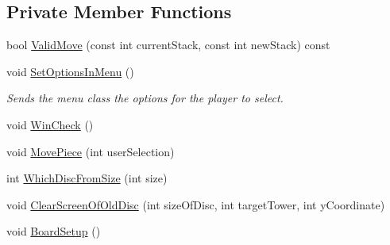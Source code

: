 \subsection*{Private Member Functions}
\begin{DoxyCompactItemize}
\item 
bool \hyperlink{classHanoi_a30dc9940db3589121396850f52ea7730}{Valid\-Move} (const int current\-Stack, const int new\-Stack) const 
\item 
void \hyperlink{classHanoi_a4dd4c6028ade2b265ce98e48c3f2fb2a}{Set\-Options\-In\-Menu} ()
\begin{DoxyCompactList}\small\item\em Sends the menu class the options for the player to select. \end{DoxyCompactList}\item 
void \hyperlink{classHanoi_aefbb40fc625506daa131076206e85b69}{Win\-Check} ()
\item 
void \hyperlink{classHanoi_a99b377a6ff0a2fc7d94d4fef0701345f}{Move\-Piece} (int user\-Selection)
\item 
int \hyperlink{classHanoi_a8ec34fb3a3682f6a8dcc1007e013ded0}{Which\-Disc\-From\-Size} (int size)
\item 
void \hyperlink{classHanoi_ad37d25d89cfdb3504d8f0702d0fff930}{Clear\-Screen\-Of\-Old\-Disc} (int size\-Of\-Disc, int target\-Tower, int y\-Coordinate)
\item 
void \hyperlink{classHanoi_a5dc7aab5bfe9d0b9d83ba75be22412e2}{Board\-Setup} ()
\end{DoxyCompactItemize}
